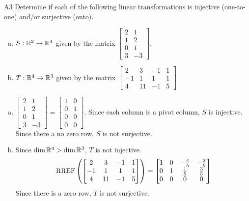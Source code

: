 \documentclass{sbgLAquiz}
\begin{document}
\begin{problem}{A3}
Determine if each of the following linear transformations is injective (one-to-one) and/or surjective (onto).
\begin{enumerate}[(a)]
\item $S: \mathbb{R}^2 \rightarrow \mathbb{R}^4$ given by the matrix $\begin{bmatrix} 2 & 1 \\ 1 & 2 \\ 0 & 1 \\ 3 & -3 \end{bmatrix}$.
\item $T: \mathbb{R}^4 \rightarrow \mathbb{R}^3$ given by the matrix $\begin{bmatrix} 2 & 3 & -1 & 1 \\ -1 & 1 & 1 & 1 \\ 4 & 11 & -1 & 5 \end{bmatrix}$
\end{enumerate}
\end{problem}
\begin{solution}
\begin{enumerate}[(a)]
\item $ \begin{bmatrix} 2 & 1 \\ 1 & 2 \\ 0 & 1 \\ 3 & -3 \end{bmatrix}=\begin{bmatrix}1 & 0 \\ 0 & 1 \\ 0 & 0 \\ 0 & 0  \end{bmatrix}$.  Since each column is a pivot column, $S$ is injective.  Since there a no zero row, $S$ is not surjective. 
\item Since $\dim \mathbb{R}^4 > \dim \mathbb{R}^3$, $T$ is not injective.
$$\operatorname{RREF}\left(\begin{bmatrix} 2 & 3 & -1 & 1 \\ -1 & 1 & 1 & 1 \\ 4 & 11 & -1 & 5 \end{bmatrix}\right) = \begin{bmatrix} 1 & 0  & -\frac{4}{5} & -\frac{2}{5} \\ 0 & 1 & \frac{1}{5} & \frac{3}{5} \\ 0 & 0 & 0 & 0 \end{bmatrix}$$
Since there is a zero row, $T$ is not surjective.
\end{enumerate}
\end{solution}
\end{document}
